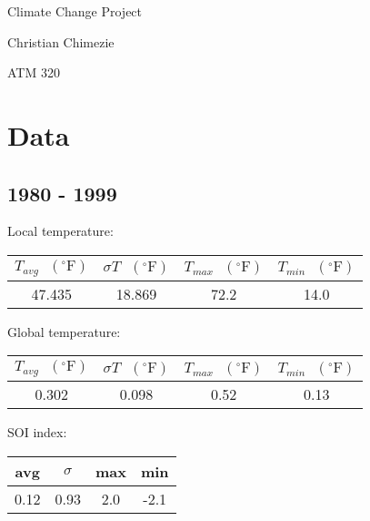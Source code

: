 \documentclass[12pt]{article}
\begin{document}
{\LARGE Climate Change Project}

{\large Christian Chimezie}

{\large ATM 320}

\noindent\makebox[\linewidth]{\rule{16.51cm}{0.4pt}}

\section*{Data}

\subsection*{1980 - 1999}
Local temperature:
\begin{center}
\begin{tabular}{c | c | c | c}
	$T_{avg} \textrm{ } (^{\circ} \textrm{F})$ &
	$\sigma T \textrm{ } (^{\circ} \textrm{F})$ &
	$T_{max} \textrm{ } (^{\circ} \textrm{F})$ &
	$T_{min} \textrm{ } (^{\circ} \textrm{F})$ \\ %
	\hline
	47.435 & 18.869 & 72.2 & 14.0 \\ %
\end{tabular}
\end{center}
Global temperature:
\begin{center}
\begin{tabular}{c | c | c | c}
	$T_{avg} \textrm{ } (^{\circ} \textrm{F})$ &
	$\sigma T \textrm{ } (^{\circ} \textrm{F})$ &
	$T_{max} \textrm{ } (^{\circ} \textrm{F})$ &
	$T_{min} \textrm{ } (^{\circ} \textrm{F})$ \\ %
	\hline
	0.302 & 0.098 & 0.52 & 0.13 \\ %
\end{tabular}
\end{center}
SOI index:
\begin{center}
\begin{tabular}{c | c | c | c}
	avg & $\sigma$ & max & min \\ %
	\hline
	0.12 & 0.93 & 2.0 & -2.1 \\ %
\end{tabular}
\end{center}
\end{document}
